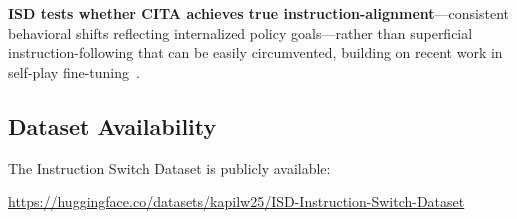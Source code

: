 \textbf{ISD tests whether CITA achieves true instruction-alignment}---consistent behavioral shifts reflecting internalized policy goals---rather than superficial instruction-following that can be easily circumvented, building on recent work in self-play fine-tuning~\cite{chen2024self}.

\vspace{-2mm}
\subsection{Dataset Availability}
\label{sec:dataset_availability}

The Instruction Switch Dataset is publicly available:

\begin{center}
\url{https://huggingface.co/datasets/kapilw25/ISD-Instruction-Switch-Dataset}
\end{center}
